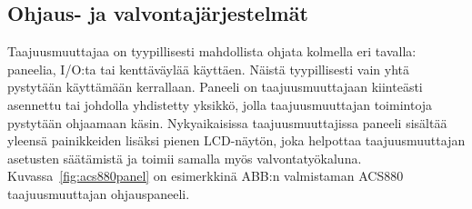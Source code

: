 \documentclass[finnish,12pt,a4paper,pdftex,elec,utf8]{aaltothesis}
\begin{document}
	



\subsection{Ohjaus- ja valvontajärjestelmät}
Taajuusmuuttajaa on tyypillisesti mahdollista ohjata kolmella eri tavalla: paneelia, I/O:ta tai kenttäväylää käyttäen. Näistä tyypillisesti vain yhtä pystytään käyttämään kerrallaan. Paneeli on taajuusmuuttajaan kiinteästi asennettu tai johdolla yhdistetty yksikkö, jolla taajuusmuuttajan toimintoja pystytään ohjaamaan käsin. Nykyaikaisissa taajuusmuuttajissa paneeli sisältää yleensä painikkeiden lisäksi pienen LCD-näytön, joka helpottaa taajuusmuuttajan asetusten säätämistä ja toimii samalla myös valvontatyökaluna. Kuvassa~\ref{fig:acs880panel} on esimerkkinä ABB:n valmistaman ACS880 taajuusmuuttajan ohjauspaneeli. 
\end{document}
